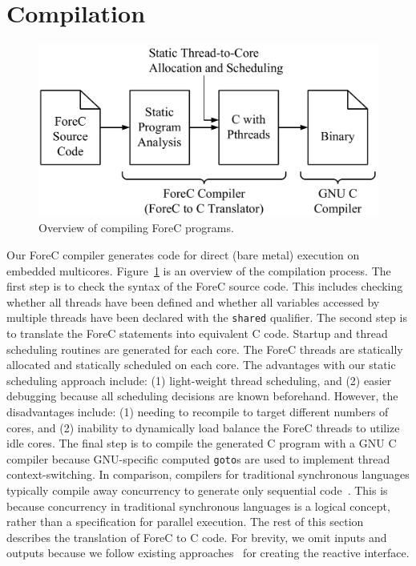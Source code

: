 \section{Compilation}
\label{sec:compilation}

\begin{figure}
	\centering

	\includegraphics[width=0.6\columnwidth]{images/compilation_overview.pdf}

	\caption{Overview of compiling ForeC programs.}
	\label{fig:compilation_overview}
\end{figure}

Our ForeC compiler 
generates code for direct (bare metal) execution on embedded
multicores. Figure~\ref{fig:compilation_overview} is
an overview of the compilation process. The first step is to
check the syntax of the ForeC source code. This includes
checking whether all threads have been defined and whether
all variables accessed by multiple threads have been
declared with the \verb$shared$ qualifier. The second step
is to translate the ForeC statements into equivalent C code.
Startup and thread scheduling routines are generated for
each core. The ForeC threads are statically allocated and
statically scheduled on each core.
The advantages with our static scheduling approach include: 
(1) light-weight thread scheduling, and 
(2) easier debugging because all scheduling decisions are known beforehand.
However, the disadvantages include:
(1) needing to recompile to target different numbers of cores, and
(2) inability to dynamically load balance the ForeC threads to utilize idle cores.
The final step is to compile the generated 
C program with a GNU C compiler because GNU-specific 
computed \verb$goto$s are used to implement
thread context-switching. In comparison, compilers for
traditional synchronous languages typically compile away
concurrency to generate only sequential code~\cite{timed_cec}.
This is because concurrency in traditional synchronous 
languages is a logical concept, rather than a specification
for parallel execution. The rest of this section describes
the translation of ForeC to C code. 
For brevity, we omit inputs and outputs 
because we follow existing approaches~\cite{timed_compiling_esterel} for
creating the reactive interface.

